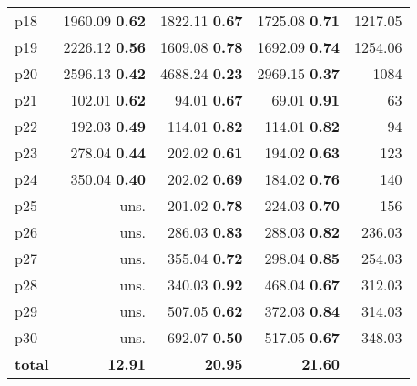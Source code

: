 \begin{tabular}{|l|rrr|r|}
p18 & {\footnotesize 1960.09} \textbf{0.62} & {\footnotesize 1822.11} \textbf{0.67} & {\footnotesize 1725.08} \textbf{0.71} & 1217.05\\
p19 & {\footnotesize 2226.12} \textbf{0.56} & {\footnotesize 1609.08} \textbf{0.78} & {\footnotesize 1692.09} \textbf{0.74} & 1254.06\\
p20 & {\footnotesize 2596.13} \textbf{0.42} & {\footnotesize 4688.24} \textbf{0.23} & {\footnotesize 2969.15} \textbf{0.37} & 1084\\
p21 & {\footnotesize 102.01} \textbf{0.62} & {\footnotesize 94.01} \textbf{0.67} & {\footnotesize 69.01} \textbf{0.91} & 63\\
p22 & {\footnotesize 192.03} \textbf{0.49} & {\footnotesize 114.01} \textbf{0.82} & {\footnotesize 114.01} \textbf{0.82} & 94\\
p23 & {\footnotesize 278.04} \textbf{0.44} & {\footnotesize 202.02} \textbf{0.61} & {\footnotesize 194.02} \textbf{0.63} & 123\\
p24 & {\footnotesize 350.04} \textbf{0.40} & {\footnotesize 202.02} \textbf{0.69} & {\footnotesize 184.02} \textbf{0.76} & 140\\
p25 & uns. & {\footnotesize 201.02} \textbf{0.78} & {\footnotesize 224.03} \textbf{0.70} & 156\\
p26 & uns. & {\footnotesize 286.03} \textbf{0.83} & {\footnotesize 288.03} \textbf{0.82} & 236.03\\
p27 & uns. & {\footnotesize 355.04} \textbf{0.72} & {\footnotesize 298.04} \textbf{0.85} & 254.03\\
p28 & uns. & {\footnotesize 340.03} \textbf{0.92} & {\footnotesize 468.04} \textbf{0.67} & 312.03\\
p29 & uns. & {\footnotesize 507.05} \textbf{0.62} & {\footnotesize 372.03} \textbf{0.84} & 314.03\\
p30 & uns. & {\footnotesize 692.07} \textbf{0.50} & {\footnotesize 517.05} \textbf{0.67} & 348.03\\
\hline
\textbf{total} & \textbf{12.91} & \textbf{20.95} & \textbf{21.60} & \\
\hline
\end{tabular}

